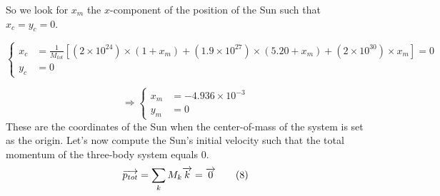 \documentclass[a4paper, twoside, 11pt]{report}
\theoremstyle{theorem}
\theoremstyle{remark}
\theoremstyle{exemple}
\begin{document}
            So we look for $x_m$ the $x$-component of the position of the Sun such that $x_c=y_c=0$.
            
                \begin{equation*}
                    \left\{
                        \begin{aligned}
                            x_c &= \frac{1}{M_{tot}} [(2 \times 10^{24}) \times (1 + x_m) + (1.9 \times 10^{27}) \times (5.20 + x_m) + (2 \times 10^{30}) \times x_m] = 0 \\
                            y_c &= 0 
                        \end{aligned}
                    \right.
                \end{equation*}
                
                \begin{equation*}
                    \Longrightarrow \left\{ 
                        \begin{aligned}
                            x_m &= -4.936 \times 10^{-3}\\
                            y_m &= 0
                        \end{aligned}
                    \right.
                    \tag{7}
                \end{equation*}
            These are the coordinates of the Sun when the center-of-mass of the system is set as the origin. Let's now compute the Sun's initial velocity such that the total momentum of the three-body system equals 0.
                \begin{equation}
                    \overrightarrow{p_{tot}} = \sum\limits_{k} M_k \overrightarrow{k} = \overrightarrow{0} \\
                    \tag{8}
                \end{equation}
                
\end{document}
